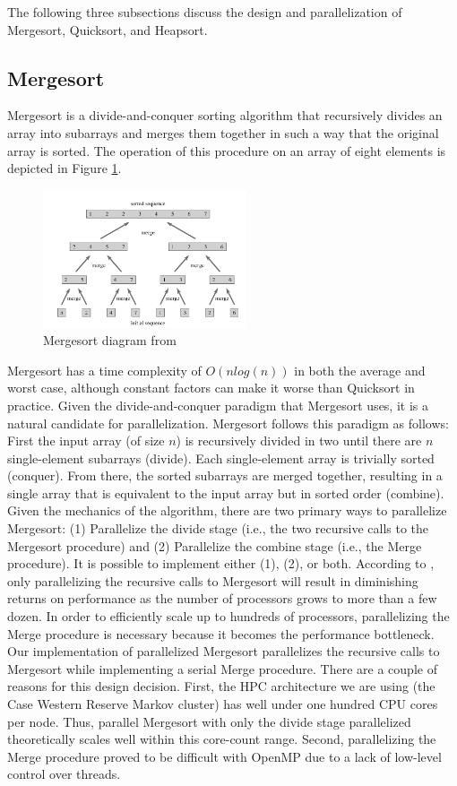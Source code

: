 \documentclass[conference]{IEEEtran}
\begin{document}
    The following three subsections discuss the design and parallelization of Mergesort, Quicksort, and Heapsort.
    
    \subsection{Mergesort}
    Mergesort is a divide-and-conquer sorting algorithm that recursively divides an array into subarrays and merges them together in such a way that the original array is sorted. 
    The operation of this procedure on an array of eight elements is depicted in Figure \ref{mrg}.  
    \begin{figure}[h]
        \includegraphics[width=6cm]{merge.png} 
        \caption{Mergesort diagram from \cite{cormen_introduction_2009}}
        \label{mrg}
    \end{figure}
    Mergesort has a time complexity of $O(nlog(n))$ in both the average and worst case, although constant factors can make it worse than Quicksort in practice. 
    Given the divide-and-conquer paradigm that Mergesort uses, it is a natural candidate for parallelization. Mergesort follows this paradigm as follows: First the input array (of size $n$) is recursively divided in two until there are $n$ single-element subarrays (divide). Each single-element array is trivially sorted (conquer). From there, the sorted subarrays are merged together, resulting in a single array that is equivalent to the input array but in sorted order (combine). Given the mechanics of the algorithm, there are two primary ways to parallelize Mergesort: (1) Parallelize the divide stage (i.e., the two recursive calls to the Mergesort procedure) and (2) Parallelize the combine stage (i.e., the Merge procedure). It is possible to implement either (1), (2), or both. According to \cite{cormen_introduction_2009}, only parallelizing the recursive calls to Mergesort will result in diminishing returns on performance as the number of processors grows to more than a few dozen. In order to efficiently scale up to hundreds of processors, parallelizing the Merge procedure is necessary because it becomes the performance bottleneck.
    Our implementation of parallelized Mergesort parallelizes the recursive calls to Mergesort while implementing a serial Merge procedure. There are a couple of reasons for this design decision. First, the HPC architecture we are using (the Case Western Reserve Markov cluster) has well under one hundred CPU cores per node. Thus, parallel Mergesort with only the divide stage parallelized theoretically scales well within this core-count range. Second, parallelizing the Merge procedure proved to be difficult with OpenMP due to a lack of low-level control over threads.
    
\end{document}
